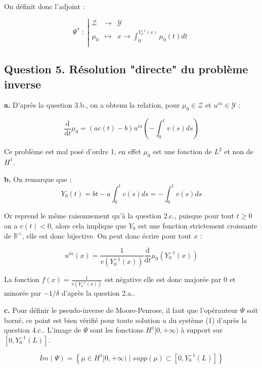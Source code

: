 \documentclass[a4paper]{article}
\newcommand{\Y}{\mathscr{Y}}
\newcommand{\Z}{\mathscr{Z}}
\begin{document}
On définit donc l'adjoint :

\begin{equation}
	 \Psi^* \; : \; \left\vert
	\begin{array}{ccc}
	\Z & \to & \Y \\
	\mu_0 & \mapsto & x \to \int_0^{Y_0^{-1}(x)} \mu_0(t)dt \\
	\end{array} \right.
\end{equation}

\subsection*{Question 5. Résolution "directe" du problème inverse}

\textbf{a.}
D'après la question 3.b., on a obtenu la relation, pour $\mu_0 \in \mathscr{Z}$ 
et $u^{in} \in \mathscr{Y}$ :

\[ \displaystyle \frac{\mathrm{d}}{\mathrm{d} t} \mu_0 
= (ac(t)-b)u^{in}(-\int_0^tv(s)ds)\]

Ce problème est mal posé d'ordre 1, en effet $\mu_0$ est une fonction de $L^2$ et non de $H^1$. 

\textbf{b.}
On remarque que :
\[ Y_0(t) = bt - a\int_0^t c(s)ds = -\int_0^t v(s)ds\]

Or reprend le même raisonnement qu'à la question 2.c., puisque pour tout $t \geq 0 $ on a $v(t)<0$,
alors cela implique que $Y_0$ est une fonction strictement croissante de $\mathbb{R}^+$, elle est donc bijective.
On peut donc écrire pour tout $x $ :

\[ u^{in}(x) = \displaystyle \frac{1}{v(Y_0^{-1}(x))} \frac{\mathrm{d}}{\mathrm{d} t} \mu_0 (Y_0^{-1}(x))\]

La fonction $f(x) = \frac{1}{v(Y_0^{-1}(x))} $ est négative elle est donc majorée par $0$ et minorée par $-1/\delta$ d'après la question 2.a..

\textbf{c.}
Pour définir le pseudo-inverse de Moore-Penrose, il faut que l'opérauteur $\Psi$ soit borné, ce point est bien vérifié pour toute solution $u$ du système (1) d'après la question 4.c..
L'image de $\Psi$ sont les fonctions $H^1[0,+\infty)$ à support sur $[0,Y_0^{-1}(L)]$.

\[ Im(\Psi) = \left\{\mu \in H^1[0,+\infty) \;|\; supp(\mu) \subset[0,Y_0^{-1}(L)] \right\} \]
\end{document}
